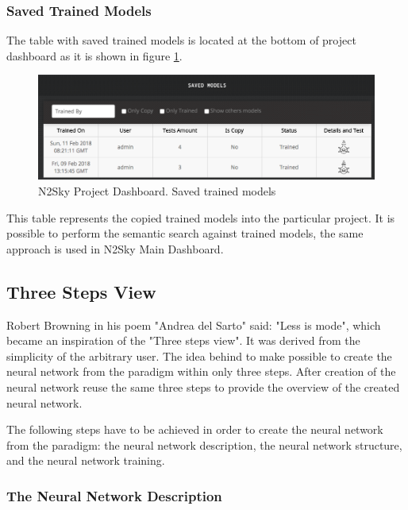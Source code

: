 \begin{itemize}
\subsubsection{Saved Trained Models}

The table with saved trained models is located at the bottom of project dashboard as it is shown in figure \ref{fig:saved_trained_models_project}.

\begin{figure}[H]
\begin{center}
  \includegraphics[width=\linewidth]{components/5/img/saved_trained_models_project.png}
  \caption{N2Sky Project Dashboard. Saved trained models}
  \label{fig:saved_trained_models_project}
\end{center}
\end{figure}

This table represents the copied trained models into the particular project. It is possible to perform the semantic search against trained models, the same approach is used in N2Sky Main Dashboard. 

\end{itemize}


\subsection{Three Steps View}\label{Three steps view}

Robert Browning in his poem "Andrea del Sarto" said: "Less is mode", which became an inspiration of the "Three steps view". It was derived from the simplicity of the arbitrary user. The idea behind to make possible to create the neural network from the paradigm within only three steps. After creation of the neural network reuse the same three steps to provide the overview of the created neural network.

The following steps have to be achieved in order to create the neural network from the paradigm:  the neural network description, the neural network structure, and the neural network training.

\subsubsection{The Neural Network Description}

